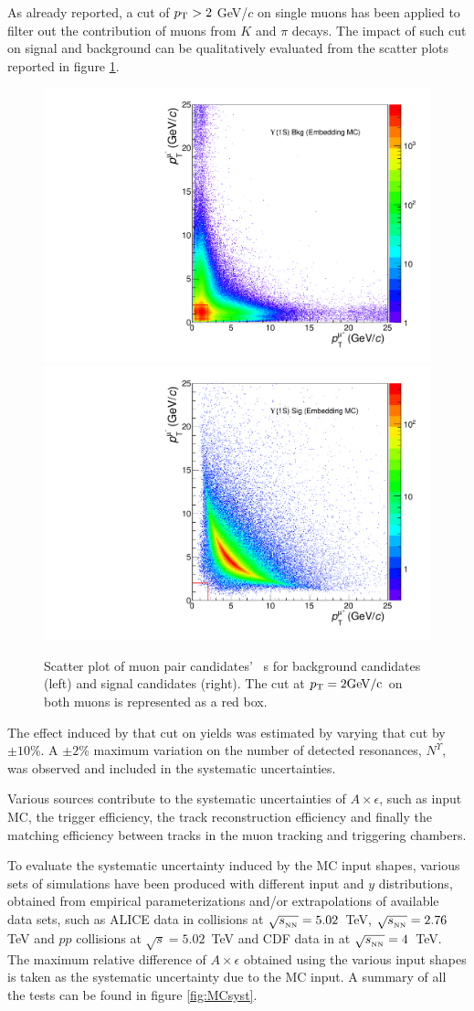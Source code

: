 As already reported, a cut of $p_{\rm T} > 2$ GeV/$c$ on single muons has been applied to filter out the contribution of muons from $K$ and $\pi$ decays.
The impact of such cut on signal and background can be qualitatively evaluated from the scatter plots reported in figure \ref{fig:ptcut}.

\begin{figure}[!b]
\begin{center}
\includegraphics[width=0.45\linewidth]{Chapters/Analysis/Figs/background.pdf}
\includegraphics[width=0.45\linewidth]{Chapters/Analysis/Figs/signal.pdf}
\caption{Scatter plot of muon pair candidates' \pt~s for background candidates (left) and signal candidates (right). The cut at $p_{\rm{T}}=2 \rm{GeV}/c$ on both muons is represented as a red box.}
\label{fig:ptcut}
\end{center}
\end{figure}

The effect induced by that cut on \upsi yields was estimated by varying that cut by $\pm10$\%.
A $\pm2$\% maximum variation on the number of detected \upsi resonances, $N^{\Upsilon}$, was observed and included in the systematic uncertainties.

Various sources contribute to the systematic uncertainties of $A\times\epsilon$, such as input MC, the trigger efficiency, the track reconstruction efficiency and finally the matching efficiency between tracks in the muon tracking and triggering chambers. 

To evaluate the systematic uncertainty induced by the MC input shapes, various sets of simulations have been produced with different \upsi input \pt and $y$ distributions, obtained from empirical parameterizations and/or extrapolations of available data sets, such as ALICE data in \pbpb collisions at $\sqrt{s_{_{\rm NN}}}=5.02$~\rm{TeV}, $\sqrt{s_{_{\rm NN}}}=2.76$ \rm{TeV} and $pp$ collisions at $\sqrt{s}=5.02$~\rm{TeV} and CDF data in \pbpb at $\sqrt{s_{_{\rm NN}}}=4$~\rm{TeV}. 
The maximum relative difference of $A\times\epsilon$ obtained using the various input shapes is taken as the systematic uncertainty due to the MC input.
A summary of all the tests can be found in figure \ref{fig:MCsyst}.

